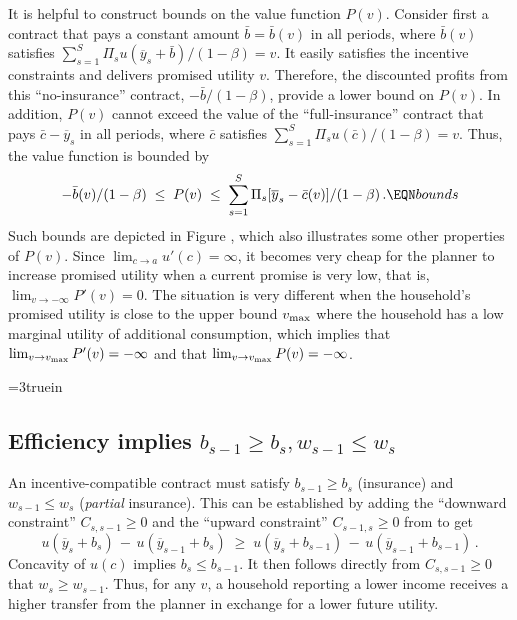 It is helpful  to construct bounds on the value function $P(v)$.
Consider first a contract that pays a constant amount $\bar b = \bar b(v)$ in all
periods, where $\bar b(v)$ satisfies $\sum_{s=1}^S \Pi_s u(\overline y_s + \bar b)
/(1-\beta) = v$. It easily satisfies the  incentive constraints  and delivers
promised utility $v$. Therefore, the discounted profits from this ``no-insurance''
contract, $- \bar b / (1 -\beta)$,
 provide a lower bound on $P(v)$. In addition, $P(v)$
cannot exceed the value of the ``full-insurance'' contract that
pays $\bar c - \overline y_s$ in all periods, where $\bar c$ satisfies
$\sum_{s=1}^S \Pi_s u(\bar c) /(1-\beta) = v$. Thus, the
value function is bounded by
$$
-\bar b(v) / (1-\beta) \;\leq\; P(v) \;\leq\;
             \sum_{s=1}^S \Pi_s [\overline y_s - \bar c(v)]/(1-\beta) \,.  \EQN bounds
$$
Such bounds are depicted in Figure %
, which also illustrates some 
other properties of $P(v)$. Since $\lim_{c\rightarrow a}u'(c)=\infty$,
it becomes very cheap for the planner to increase  promised
utility when a current promise is very low, that is,
$\lim_{v\rightarrow -\infty}P'(v)=0$. The situation is very different
when the household's promised utility is close to the upper
bound $v_{\rm max}$ where the household has a low marginal utility
of additional consumption, which implies that
$\lim_{v\rightarrow v_{\rm max}}P'(v)=-\infty$ and that
$\lim_{v\rightarrow v_{\rm max}}P(v)=-\infty$.


\centerline{\epsfxsize=3truein}
\caption{Value function $P(v)$ and  two dashed curves that depict  bounds on the
value function. The vertical solid line indicates $v_{\rm max}={\rm sup}\,u(c)/(1-\beta)$.}
\endfigure


\subsection{Efficiency implies $b_{s-1} \geq b_s, w_{s-1} \leq w_s$}\label{sec:effimplies}%
%
An incentive-compatible contract must satisfy $b_{s-1}\geq b_s$ (insurance)  and
$w_{s-1}\leq w_s$ ({\it partial\/} insurance).  This  can be established by adding the ``downward
constraint'' $C_{s,s-1}\geq 0$ and the ``upward constraint''
$C_{s-1,s}\geq 0$ from  to get
$$
u(\overline y_s + b_s) \,-\, u(\overline y_{s-1} + b_s) \;\geq\;
u(\overline y_s + b_{s-1}) \,-\, u(\overline y_{s-1} + b_{s-1})\, .
$$
Concavity of $u(c)$ implies $b_s\leq b_{s-1}$.
It then follows directly from
$C_{s,s-1}\geq 0$ that $w_s \geq w_{s-1}$.
Thus, for any $v$, a household reporting a lower income receives a
higher transfer from the planner in exchange for a lower
future utility.

